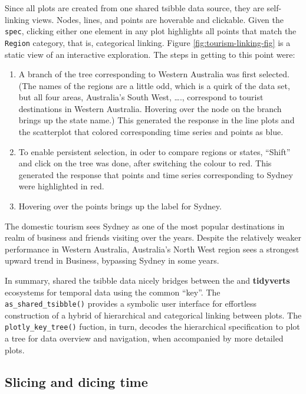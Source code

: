 Since all plots are created from one shared tsibble data source, they
are self-linking views. Nodes, lines, and points are hoverable and
clickable. Given the \texttt{spec}, clicking either one element in any
plot highlights all points that match the \texttt{Region} category, that
is, categorical linking. Figure \ref{fig:tourism-linking-fig} is a
static view of an interactive exploration. The steps in getting to this
point were:

\begin{enumerate}
\def\labelenumi{\arabic{enumi}.}
\tightlist
\item
  A branch of the tree corresponding to Western Australia was first
  selected. (The names of the regions are a little odd, which is a quirk
  of the data set, but all four areas, Australia's South West, \ldots.,
  correspond to tourist destinations in Western Australia. Hovering over
  the node on the branch brings up the state name.) This generated the
  response in the line plots and the scatterplot that colored
  corresponding time series and points as blue.
\item
  To enable persistent selection, in oder to compare regions or states,
  ``Shift'' and click on the tree was done, after switching the colour
  to red. This generated the response that points and time series
  corresponding to Sydney were highlighted in red.
\item
  Hovering over the points brings up the label for Sydney.
\end{enumerate}

The domestic tourism sees Sydney as one of the most popular destinations
in realm of business and friends visiting over the years. Despite the
relatively weaker performance in Western Australia, Australia's North
West region sees a strongest upward trend in Business, bypassing Sydney
in some years.

In summary, shared the tsibble data nicely bridges between the
 and \textbf{tidyverts} ecosystems for temporal data
using the common ``key''. The \texttt{as\_shared\_tsibble()} provides a
symbolic user interface for effortless construction of a hybrid of
hierarchical and categorical linking between plots. The
\texttt{plotly\_key\_tree()} fuction, in turn, decodes the hierarchical
specification to plot a tree for data overview and navigation, when
accompanied by more detailed plots.

\hypertarget{slicing-and-dicing-time}{%
\subsection{Slicing and dicing time}\label{slicing-and-dicing-time}}

